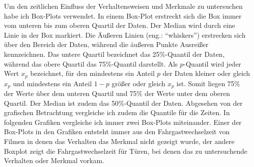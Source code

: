 Um den zeitlichen Einfluss der Verhaltensweisen und Merkmale zu untersuchen habe ich Box-Plots verwendet. In einem Box-Plot erstreckt sich die Box immer vom unteren bis zum oberen Quartil der Daten. Der Median wird durch eine Linie in der Box markiert. Die Äußeren Linien (eng.: "`whiskers"') erstrecken sich über den Bereich der Daten, während die äußeren Punkte Ausreißer kennzeichnen. Das untere Quartil bezeichnet das 25\%-Quantil der Daten, während das obere Quartil das 75\%-Quantil darstellt. Als $p$-Quantil wird jeder Wert $x_p$ bezeichnet, für den mindestens ein Anteil $p$ der Daten kleiner oder gleich $x_p$ und mindestens ein Anteil $1-p$ größer oder gleich $x_p$ ist. Somit liegen 75\% der Werte über dem unteren Quartil und 75\% der Werte unter dem oberen Quartil. Der Median ist zudem das 50\%-Quantil der Daten. Abgesehen von der grafischen Betrachtung vergleiche ich zudem die Quantile für die Zeiten. In folgenden Grafiken vergleiche ich immer zwei Box-Plots miteinander. Einer der Box-Plots in den Grafiken entsteht immer aus den Fahrgastwechselzeit von Filmen in denen das Verhalten \bzw das Merkmal nicht gezeigt wurde, der andere Boxplot zeigt die Fahrgastwechselzeit für Türen, bei denen das zu untersuchende Verhalten oder Merkmal vorkam.

